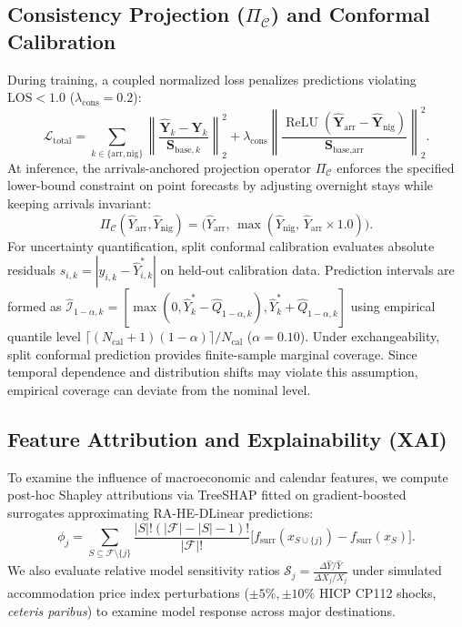\documentclass[sigconf]{acmart}
\begin{document}
\subsection{Consistency Projection \texorpdfstring{($\Pi_{\mathcal{C}}$)}{(Pi\_C)} and Conformal Calibration}
During training, a coupled normalized loss penalizes predictions violating $\text{LOS} < 1.0$ ($\lambda_{\text{cons}}=0.2$):
\begin{equation}
\mathcal{L}_{\text{total}} = \sum_{k \in \{\text{arr}, \text{nig}\}} \left\|\frac{\hat{\mathbf{Y}}_k - \mathbf{Y}_k}{\mathbf{S}_{\text{base}, k}}\right\|_2^2 + \lambda_{\text{cons}} \left\|\frac{\operatorname{ReLU}(\hat{\mathbf{Y}}_{\text{arr}} - \hat{\mathbf{Y}}_{\text{nig}})}{\mathbf{S}_{\text{base}, \text{arr}}}\right\|_2^2.
\label{eq:coupled_loss}
\end{equation}
At inference, the arrivals-anchored projection operator $\Pi_{\mathcal{C}}$ enforces the specified lower-bound constraint on point forecasts by adjusting overnight stays while keeping arrivals invariant:
\begin{equation}
\Pi_{\mathcal{C}}(\hat{Y}_{\text{arr}}, \hat{Y}_{\text{nig}}) = \big(\hat{Y}_{\text{arr}}, \, \max(\hat{Y}_{\text{nig}}, \, \hat{Y}_{\text{arr}} \times 1.0)\big).
\label{eq:projection}
\end{equation}
For uncertainty quantification, split conformal calibration \cite{vovk2005algorithmic,angelopoulos2021conformal,barber2023conformal} evaluates absolute residuals $s_{i,k}=|y_{i,k}-\hat{Y}_{i,k}^*|$ on held-out calibration data. Prediction intervals are formed as $\hat{\mathcal{I}}_{1-\alpha,k}=[\max(0,\hat{Y}_k^*-\hat{Q}_{1-\alpha,k}),\hat{Y}_k^*+\hat{Q}_{1-\alpha,k}]$ using empirical quantile level $\lceil(N_{\text{cal}}+1)(1-\alpha)\rceil/N_{\text{cal}}$ ($\alpha=0.10$). Under exchangeability, split conformal prediction provides finite-sample marginal coverage. Since temporal dependence and distribution shifts may violate this assumption, empirical coverage can deviate from the nominal level.

\subsection{Feature Attribution and Explainability (XAI)}
\label{sec:method_xai}
To examine the influence of macroeconomic and calendar features, we compute post-hoc Shapley attributions via TreeSHAP \cite{lundberg2020treeshap} fitted on gradient-boosted surrogates approximating RA-HE-DLinear predictions:
\begin{equation}
\phi_j = \sum_{S \subseteq \mathcal{F} \setminus \{j\}} \frac{|S|!(|\mathcal{F}| - |S| - 1)!}{|\mathcal{F}|!} \Big[f_{\text{surr}}(x_{S \cup \{j\}}) - f_{\text{surr}}(x_S)\Big].
\label{eq:shap_attribution}
\end{equation}
We also evaluate relative model sensitivity ratios $\mathcal{S}_j = \frac{\Delta \hat{Y}/\hat{Y}}{\Delta X_j/X_j}$ under simulated accommodation price index perturbations ($\pm 5\%, \pm 10\%$ HICP CP112 shocks, \emph{ceteris paribus}) to examine model response across major destinations.
\end{document}
